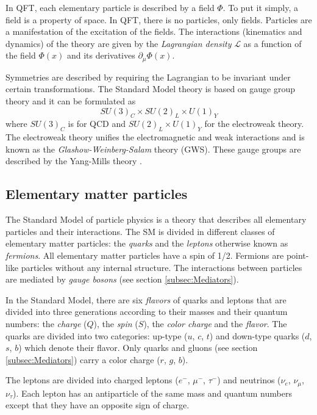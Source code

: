 In QFT, each elementary particle is described by a field $\Phi$. To put it simply, a field is a property of space. In QFT, there is no particles, only fields. Particles are a manifestation of the excitation of the fields. The interactions (kinematics and dynamics) of the theory are given by the \textit{Lagrangian density} $\mathcal{L}$ as a function of the field $\Phi(x)$ and its derivatives $\partial_{\mu}\Phi(x)$.

Symmetries are described by requiring the Lagrangian to be invariant under certain transformations. The Standard Model theory is based on gauge group theory and it can be formulated as
\begin{equation}
  SU(3)_{C} \times SU(2)_{L} \times U(1)_{Y}
\end{equation}
where $SU(3)_{C}$ is for QCD and $SU(2)_{L} \times U(1)_{Y}$ for the electroweak theory. The electroweak theory unifies the electromagnetic and weak interactions and is known as the \textit{Glashow-Weinberg-Salam} theory (GWS). These gauge groups are described by the Yang-Mills theory \cite{Yang:1954ek}.

\subsection{Elementary matter particles}

The Standard Model of particle physics is a theory that describes all elementary particles and their interactions. The SM is divided in different classes of elementary matter particles: the \textit{quarks} and the \textit{leptons} otherwise known as \textit{fermions}. All elementary matter particles have a spin of 1/2. Fermions are point-like particles without any internal structure. The interactions between particles are mediated by \textit{gauge bosons} (see section \ref{subsec:Mediators}).

In the Standard Model, there are six \textit{flavors} of quarks and leptons that are divided into three generations according to their masses and their quantum numbers: the \textit{charge} ($Q$), the \textit{spin} ($S$), the \textit{color charge} and the \textit{flavor}. The quarks are divided into two categories: up-type ($u$, $c$, $t$) and down-type quarks ($d$, $s$, $b$) which denote their flavor. Only quarks and gluons (see section \ref{subsec:Mediators}) carry a color charge ($r$, $g$, $b$).

The leptons are divided into charged leptons ($e^-$, $\mu^-$, $\tau^-$) and neutrinos ($\nu_e$, $\nu_{\mu}$, $\nu_{\tau}$). Each lepton has an antiparticle of the same mass and quantum numbers except that they have an opposite sign of charge.

